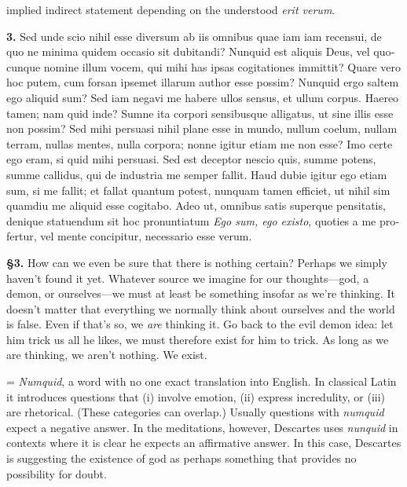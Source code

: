  implied indirect statement depending on the understood \textit{erit verum}.


\clearpage

\beginnumbering
\pstart
\begin{latin}
    \textenglish{\textbf{3.}} Sed unde scio nihil esse diversum ab iis omnibus quae iam iam recensui, de quo ne minima quidem occasio sit dubitandi? Nunquid est aliquis Deus, vel quocunque nomine illum vocem, qui mihi has ipsas cogitationes immittit? Quare vero hoc putem, cum forsan ipsemet illarum author esse possim? Nunquid ergo saltem ego aliquid sum? Sed iam negavi me habere ullos sensus, et ullum corpus. Haereo tamen; nam quid  inde? Sumne ita corpori sensibusque alligatus, ut sine illis esse non possim? Sed mihi persuasi nihil plane esse in mundo, nullum coelum, nullam terram, nullas mentes, nulla corpora; nonne igitur etiam me non esse? Imo certe ego eram, si quid mihi persuasi. Sed est deceptor nescio quis, summe potens, summe callidus, qui de industria me semper fallit. Haud dubie igitur ego etiam sum, si me fallit; et fallat quantum potest, nunquam tamen efficiet, ut nihil sim quamdiu me aliquid esse cogitabo. Adeo ut, omnibus satis superque pensitatis, denique statuendum sit hoc pronuntiatum \textit{Ego sum, ego existo}, quoties a me profertur, vel mente concipitur, necessario esse verum.
\end{latin}
\pend
\endnumbering

\prenotes

\textbf{§3.} How can we even be sure that there is nothing certain? Perhaps we simply haven't found it yet. Whatever source we imagine for our thoughts---god, a demon, or ourselves---we must at least be something insofar as we're thinking. It doesn't matter that everything we normally think about ourselves and the world is false. Even if that's so, we \textit{are} thinking it. Go back to the evil demon idea: let him trick us all he likes, we must therefore exist for him to trick. As long as we are thinking, we aren't nothing. We exist.

 = \textit{Numquid}, a word with no one exact translation into English. In classical Latin it introduces questions that (i) involve emotion, (ii) express incredulity, or (iii) are rhetorical. (These categories can overlap.) Usually questions with \textit{numquid} expect a negative answer. In the meditations, however, Descartes uses \textit{nunquid} in contexts where it is clear he expects an affirmative answer. In this case, Descartes is suggesting the existence of god as perhaps something that provides no possibility for doubt.

